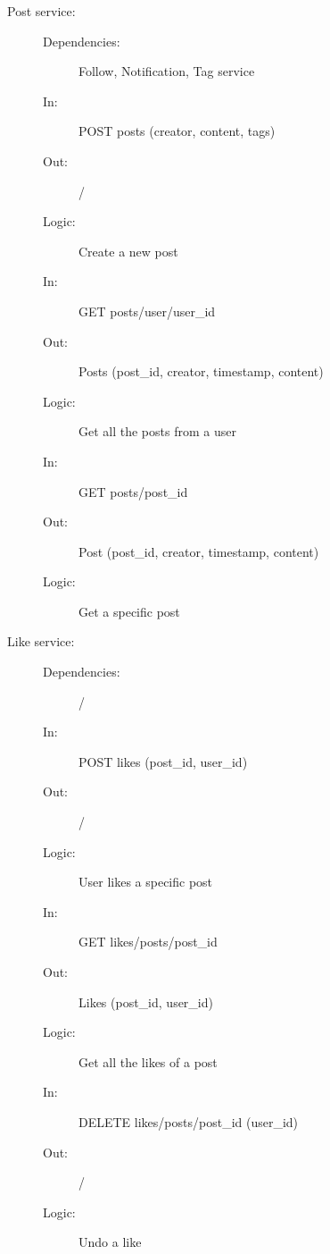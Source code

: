 \documentclass{article}
\begin{document}
\begin{description}
    \item [Post service:]
    \begin{description}
        \item[]
        \item[Dependencies:] Follow, Notification, Tag service
    \end{description}
    \begin{description}
        \item[]
        \item[In:] POST posts (creator, content, tags)
        \item[Out:] /
        \item[Logic:] Create a new post
        \item[]

        \item[In:] GET posts/user/user\_id
        \item[Out:] Posts (post\_id, creator, timestamp, content)
        \item[Logic:] Get all the posts from a user
        \item[]

        \item[In:] GET posts/post\_id
        \item[Out:] Post (post\_id, creator, timestamp, content)
        \item[Logic:] Get a specific post
    \end{description}
\end{description}

\begin{description}
    \item [Like service:]
    \begin{description}
        \item[]
        \item[Dependencies:] /
    \end{description}
    \begin{description}
        \item[]
        \item[In:] POST likes (post\_id, user\_id)
        \item[Out:] /
        \item[Logic:] User likes a specific post
        \item[]

        \item[In:] GET likes/posts/post\_id
        \item[Out:] Likes (post\_id, user\_id)
        \item[Logic:] Get all the likes of a post
        \item[]
        
        \item[In:] DELETE likes/posts/post\_id (user\_id)
        \item[Out:] /
        \item[Logic:] Undo a like
        \item[]
    \end{description}
\end{description}
\end{document}
